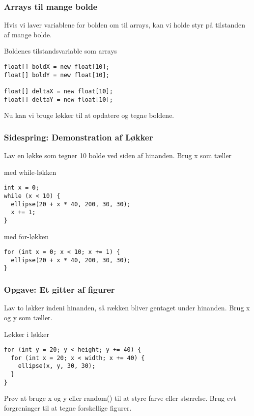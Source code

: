 \documentclass{beamer}
\begin{document}
\begin{frame}[fragile]
  \frametitle{Arrays til mange bolde}
  
  Hvis vi laver variablene for bolden om til arrays, kan vi holde styr
  på tilstanden af mange bolde.
 
  \begin{block}{Boldenes tilstandsvariable som arrays}
\begin{verbatim}
float[] boldX = new float[10];
float[] boldY = new float[10];

float[] deltaX = new float[10];
float[] deltaY = new float[10];
\end{verbatim}
  \end{block}
  
  Nu kan vi bruge løkker til at opdatere og tegne boldene.
  
\end{frame}


\begin{frame}[fragile]
  \frametitle{Sidespring: Demonstration af Løkker}

  Lav en løkke som tegner 10 bolde ved siden af hinanden. Brug x som tæller
  \begin{block}{med while-løkken}  
\begin{verbatim}
int x = 0;
while (x < 10) {
  ellipse(20 + x * 40, 200, 30, 30);
  x += 1;
}
\end{verbatim}  
  \end{block}
  
  \begin{block}{med for-løkken}
\begin{verbatim}
for (int x = 0; x < 10; x += 1) {
  ellipse(20 + x * 40, 200, 30, 30);
}
\end{verbatim}  
  \end{block}
    
\end{frame}

\begin{frame}[fragile]
  \frametitle{Opgave: Et gitter af figurer}

  Lav to løkker indeni hinanden, så rækken bliver gentaget under hinanden. Brug x og y som tæller. 
  
  \begin{block}{Løkker i løkker}    
\begin{verbatim}
for (int y = 20; y < height; y += 40) {
  for (int x = 20; x < width; x += 40) {
    ellipse(x, y, 30, 30);
  }
}
\end{verbatim}  
  \end{block}
  
Prøv at bruge x og y eller random() til at styre farve eller størrelse. Brug evt forgreninger til at tegne forskellige figurer.
  
\end{frame}
\end{document}
